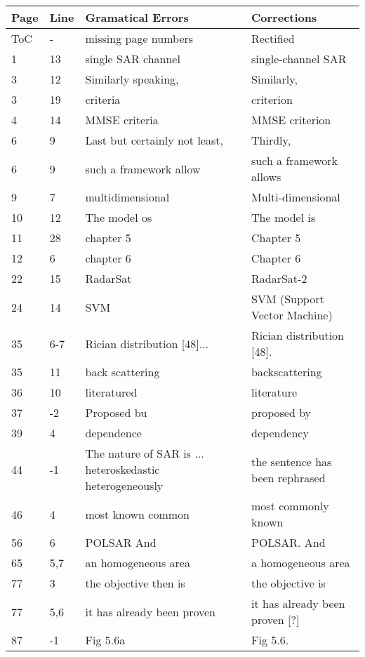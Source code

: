 \noindent
\begin{longtable}[c]{p{}|p{}|p{}|p{}}
\textbf{Page} & \textbf{Line} & \textbf{Gramatical Errors} & \textbf{Corrections} \\
 \hline
 \endhead
ToC & - & missing page numbers & Rectified \\
1 & 13 & single SAR channel & single-channel SAR \\ 
3 & 12 & Similarly speaking, & Similarly, \\
3 & 19 & criteria & criterion \\ 
4 & 14 & MMSE criteria & MMSE criterion \\
6 & 9 & Last but certainly not least, & Thirdly, \\ 
6 & 9 & such a framework allow & such a framework allows \\
9 & 7 & multidimensional & Multi-dimensional \\
10 & 12 & The model os & The model is \\
11 & 28 & chapter 5 & Chapter 5 \\
12 & 6 & chapter 6 & Chapter 6 \\
22 & 15 & RadarSat & RadarSat-2 \\
24 & 14 & SVM & SVM (Support Vector Machine) \\
35 & 6-7 & Rician distribution [48]... & Rician distribution [48]. \\
35 & 11 & back scattering & backscattering \\
36 & 10 & literatured & literature \\   %
37 & -2 & Proposed bu & proposed by \\
39 & 4 & dependence & dependency \\
44 & -1 & The nature of SAR is ... heteroskedastic heterogeneously & the sentence has been rephrased \\
46 & 4 & most known common & most commonly known \\
56 & 6 & POLSAR And & POLSAR. And \\
65 &5,7 & an homogeneous area & a homogeneous area \\
77 & 3 & the objective then is & the objective is \\
77 & 5,6 & it has already been proven & it has already been proven [?] \\
87 & -1 & Fig 5.6a & Fig 5.6. \\

\end{longtable}
